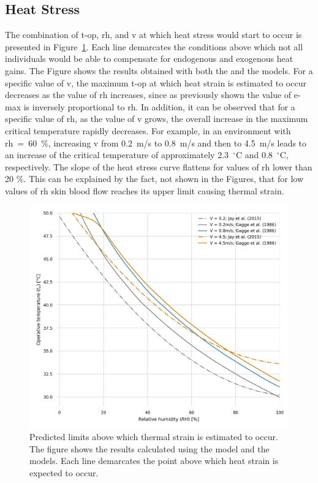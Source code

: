 \subsection{Heat Stress}\label{subsec:heat-stress}

The combination of \ac{t-op}, \ac{rh}, and \ac{v} at which heat stress would start to occur is presented in Figure~\ref{fig:comparison_air_speed}.
Each line demarcates the conditions above which not all individuals would be able to compensate for endogenous and exogenous heat gains.
The Figure shows the results obtained with both the  and the  models.
For a specific value of \ac{v}, the maximum \ac{t-op} at which heat strain is estimated to occur decreases as the value of \ac{rh} increases, since as previously shown the value of \ac{e-max} is inversely proportional to \ac{rh}.
In addition, it can be observed that for a specific value of \ac{rh}, as the value of \ac{v} grows, the overall increase in the maximum critical temperature rapidly decreases.
For example, in an environment with \ac{rh}~=~60~\%, increasing \ac{v} from 0.2~m/s to 0.8~m/s and then to 4.5~m/s leads to an increase of the critical temperature of approximately 2.3~$^{\circ}$C and 0.8~$^{\circ}$C, respectively.
The slope of the heat stress curve flattens for values of \ac{rh} lower than 20 \%.
This can be explained by the fact, not shown in the Figures, that for low values of \ac{rh} skin blood flow reaches its upper limit causing thermal strain.

\begin{figure}[thb!]
    \centering
    \includegraphics[width=\textwidth]{figures/comparison_air_speed}
    \caption{Predicted limits above which thermal strain is estimated to occur.
    The figure shows the results calculated using the  model and the  models.
    Each line demarcates the point above which heat strain is expected to occur.}
    \label{fig:comparison_air_speed}
\end{figure}


